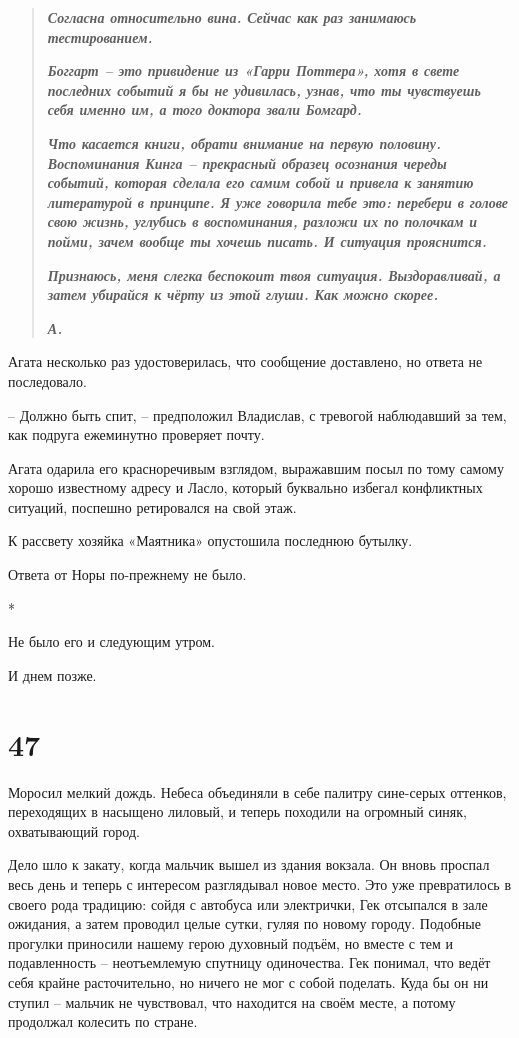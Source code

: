\documentclass[
  a5paperpaper,
  DIV=11,
  numbers=noendperiod]{scrreprt}
\begin{document}
\begin{quote}
\textbf{\emph{Согласна относительно вина. Сейчас как раз занимаюсь
тестированием.}}

\textbf{\emph{Боггарт -- это привидение из «Гарри Поттера», хотя в свете
последних событий я бы не удивилась, узнав, что ты чувствуешь себя
именно им, а того доктора звали Бомгард.}}

\textbf{\emph{Что касается книги, обрати внимание на первую половину.
Воспоминания Кинга -- прекрасный образец осознания череды событий,
которая сделала его самим собой и привела к занятию литературой в
принципе. Я уже говорила тебе это: перебери в голове свою жизнь,
углубись в воспоминания, разложи их по полочкам и пойми, зачем вообще ты
хочешь писать. И ситуация прояснится.}}

\textbf{\emph{Признаюсь, меня слегка беспокоит твоя ситуация.
Выздоравливай, а затем убирайся к чёрту из этой глуши. Как можно
скорее.}}

\textbf{\emph{А.}}
\end{quote}

Агата несколько раз удостоверилась, что сообщение доставлено, но ответа
не последовало.

-- Должно быть спит, -- предположил Владислав, с тревогой наблюдавший за
тем, как подруга ежеминутно проверяет почту.

Агата одарила его красноречивым взглядом, выражавшим посыл по тому
самому хорошо известному адресу и Ласло, который буквально избегал
конфликтных ситуаций, поспешно ретировался на свой этаж.

К рассвету хозяйка «Маятника» опустошила последнюю бутылку.

Ответа от Норы по-прежнему не было.

*

Не было его и следующим утром.

И днем позже.

\section*{47}\label{47}


Моросил мелкий дождь. Небеса объединяли в себе палитру сине-серых
оттенков, переходящих в насыщено лиловый, и теперь походили на огромный
синяк, охватывающий город.

Дело шло к закату, когда мальчик вышел из здания вокзала. Он вновь
проспал весь день и теперь с интересом разглядывал новое место. Это уже
превратилось в своего рода традицию: сойдя с автобуса или электрички,
Гек отсыпался в зале ожидания, а затем проводил целые сутки, гуляя по
новому городу. Подобные прогулки приносили нашему герою духовный подъём,
но вместе с тем и подавленность -- неотъемлемую спутницу одиночества.
Гек понимал, что ведёт себя крайне расточительно, но ничего не мог с
собой поделать. Куда бы он ни ступил -- мальчик не чувствовал, что
находится на своём месте, а потому продолжал колесить по стране.
\end{document}
